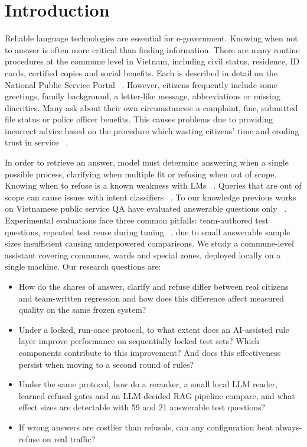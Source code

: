 \documentclass[runningheads]{llncs}
\begin{document}
\section{Introduction}

{Reliable language technologies are essential for e-government. Knowing when not to answer is often more critical than finding information. There are many routine procedures at the commune level in Vietnam, including civil status, residence, ID cards, certified copies and social benefits. Each is described in detail on the National Public Service Portal ~\cite{dvcportal}. However, citizens frequently include some greetings, family background, a letter-like message, abbreviations or missing diacritics. Many ask about their own circumstances: a complaint, fine, submitted file status or police officer benefits. This causes problems due to providing incorrect advice based on the procedure which wasting citizens' time and eroding trust in service ~\cite{kaplan2026,samson2026}.}

{In order to retrieve an answer, model must determine answering when a single possible process, clarifying when multiple fit or refusing when out of scope. Knowing when to refuse is a known weakness with LMs ~\cite{wen2025,kamath2020}. Queries that are out of scope can cause issues with intent classifiers ~\cite{larson2019}. To our knowledge previous works on Vietnamese public service QA have evaluated answerable questions only ~\cite{phamduy2023}. Experimental evaluations face three common pitfalls: team-authored test questions, repeated test reuse during tuning ~\cite{dwork2015,gorman2019}, due to small answerable sample sizes insufficient causing underpowered comparisons. We study a commune-level assistant covering communes, wards and special zones, deployed locally on a single machine. Our research questions are:}
\begin{itemize}

\item[\textbf{RQ1}]
{How do the shares of answer, clarify and refuse differ between real citizens and team-written regression and how does this difference affect measured quality on the same frozen system?}

\item[\textbf{RQ2}]
{Under a locked, run-once protocol, to what extent does an AI-assisted rule layer improve performance on sequentially locked test sets? Which components contribute to this improvement? And does this effectiveness persist when moving to a second round of rules?}

\item[\textbf{RQ3}]
{Under the same protocol, how do a reranker, a small local LLM reader, learned refusal gates and an LLM-decided RAG pipeline compare, and what effect sizes are detectable with 59 and 21 answerable test questions?}

\item[\textbf{RQ4}]
{If wrong answers are costlier than refusals, can any configuration beat always-refuse on real traffic?}
\end{itemize}
\end{document}
